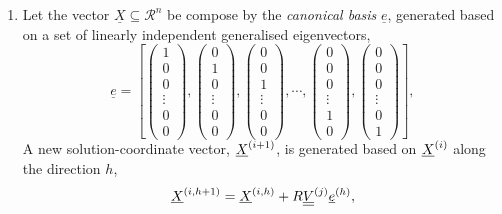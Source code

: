 \begin{enumerate}[{\bf Step 1: }]
   \item\label{Step4} Let the vector $\underline{X}\subseteq\mathcal{R}^{n}$ be compose by the {\it canonical basis} $\underline{e}$, \ie generated based on a set of linearly independent generalised eigenvectors,
   \begin{displaymath}
      \underline{e} = \left[
             \begin{pmatrix}1 \\ 0 \\ 0 \\ \vdots \\ 0 \\ 0 \end{pmatrix},
             \begin{pmatrix}0 \\ 1 \\ 0 \\ \vdots \\ 0 \\ 0 \end{pmatrix},
             \begin{pmatrix}0 \\ 0 \\ 1 \\ \vdots \\ 0 \\ 0 \end{pmatrix},
             \cdots,
             \begin{pmatrix}0 \\ 0 \\ 0 \\ \vdots \\ 1 \\ 0 \end{pmatrix},
             \begin{pmatrix}0 \\ 0 \\ 0 \\ \vdots \\ 0 \\ 1 \end{pmatrix}
      \right],
   \end{displaymath}
A new solution-coordinate vector, $\mfr[\underline{X}]{}{i+1}$, is generated based on $\mfr[\underline{X}]{}{i}$ along the direction $h$,
      \begin{equation}
         \mfr[\underline{X}]{}{i,h+1} = \mfr[\underline{X}]{}{i,h} + R \mfr[\underline{\underline{V}}]{}{j}\mfr[\underline{e}]{}{h},\label{Chapter:GlobalOpt:Eqn:XEvolution}
      \end{equation}

\end{enumerate}
